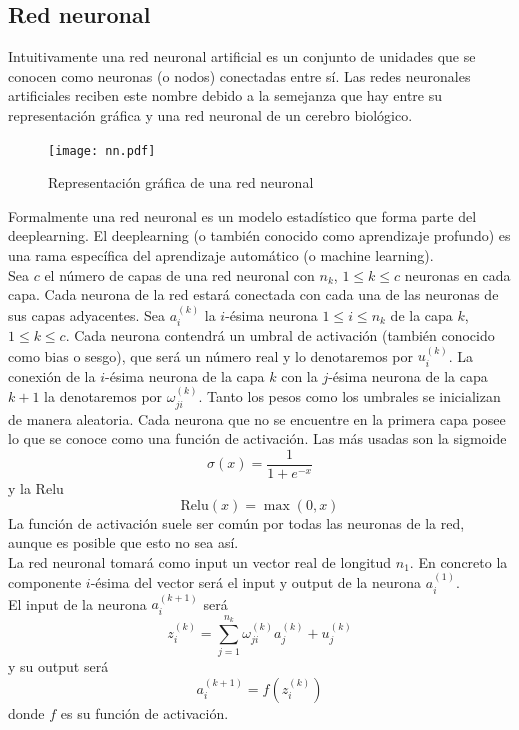 \documentclass{article}
\begin{document}
\subsection{Red neuronal}
Intuitivamente una red neuronal artificial es un conjunto de unidades que se conocen como neuronas (o nodos) conectadas entre sí. Las redes neuronales artificiales reciben este nombre debido a la semejanza que hay entre su representación gráfica y una red neuronal de un cerebro biológico.\\

\begin{figure}[htbp]
\centering
\texttt{[image: nn.pdf]}
\caption{Representación gráfica de una red neuronal}
\end{figure}
Formalmente una red neuronal es un modelo estadístico que forma parte del deeplearning. El deeplearning (o también conocido como aprendizaje profundo) es una rama específica del aprendizaje automático (o machine learning).\\


Sea $c$ el número de capas de una red neuronal con $n_k$, $1\leq k\leq c$ neuronas en cada capa. Cada neurona de la red estará conectada con cada una de las neuronas de sus capas adyacentes. Sea $a_i^{(k)}$ la $i$-ésima neurona $1\leq i\leq n_k$ de la capa $k$, $1\leq k\leq c$. Cada neurona contendrá un umbral de activación (también conocido como bias o sesgo), que será un número real y lo denotaremos por $u_i^{(k)} $. La conexión de la $i$-ésima neurona de la capa $k$ con la $j$-ésima neurona de la capa $k+1$ la denotaremos por $\omega_{ji}^{(k)} $. Tanto los pesos como los umbrales se inicializan de manera aleatoria. Cada neurona que no se encuentre en la primera capa posee lo que se conoce como una función de activación. Las más usadas son la sigmoide
$$\sigma(x)=\frac{1}{1+e^{-x}} $$
y la Relu
$$\text{Relu}(x)=\max(0,x) $$
La función de activación suele ser común por todas las neuronas de la red, aunque es posible que esto no sea así.\\

La red neuronal tomará como input un vector real de longitud $n_1$. En concreto la componente $i$-ésima del vector será el input y output de la neurona $a_i^{(1)}$.\\
El input de la neurona $a_i^{(k+1)} $ será
$$z_i^{(k)}=\sum_{j=1}^{n_k} \omega_{ji}^{(k)} a_j^{(k)}+u_j^{(k)} $$
y su output será
$$a_i^{(k+1)}=f(z_i^{(k)}) $$
donde $f$ es su función de activación.
\end{document}
